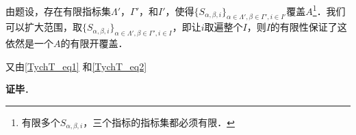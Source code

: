 由题设，存在有限指标集$\Lambda'$，$\Gamma'$，和$I'$，使得$\{S_{\alpha, \beta, i}\}_{\alpha\in \Lambda', \beta\in \Gamma', i\in I'}$覆盖$A$\footnote{有限多个$S_{\alpha, \beta, i}$，三个指标的指标集都必须有限．}．我们可以扩大范围，取$\{S_{\alpha, \beta, i}\}_{\alpha\in \Lambda', \beta\in \Gamma', i\in I}$，即让$i$取遍整个$I$，则$I$的有限性保证了这依然是一个$A$的有限开覆盖．

又由\autoref{TychT_eq1} 和\autoref{TychT_eq2} 

\textbf{证毕}．























